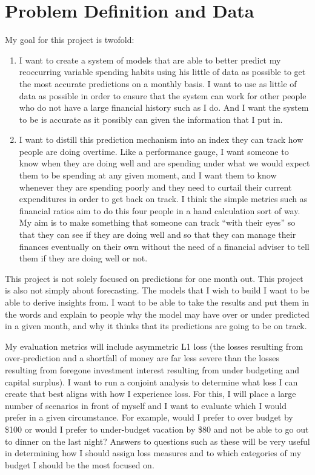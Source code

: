 \documentclass[11pt,a4paper]{article}
\begin{document}
\section{Problem Definition and Data}
\label{sec:problem}

My goal for this project is twofold: 
\begin{enumerate}
	\item I want to create a system of models that are able to better predict my reoccurring variable spending habits using his little of data as possible to get the most accurate predictions on a monthly basis.  I want to use as little of data as possible in order to ensure that the system can work for other people who do not have a large financial history such as I do. And I want the system to be is accurate as it possibly can given the information that I put in.
	\item I want to distill this prediction mechanism into an index they can track how people are doing overtime. Like a performance gauge, I want someone to know when they are doing well and are spending under what we would expect them to be spending at any given moment, and I want them to know whenever they are spending poorly and they need to curtail their current expenditures in order to get back on track. I think the simple metrics such as financial ratios aim to do this four people in a hand calculation sort of way. My aim is to make something that someone can track “with their eyes” so that they can see if they are doing well and so that they can manage their finances eventually on their own without the need of a financial adviser to tell them if they are doing well or not. 
\end{enumerate}

This project is not solely focused on predictions for one month out. This project is also not simply about forecasting. The models that I wish to build I want to be able to derive insights from. I want to be able to take the results and put them in the words and explain to people why the model may have over or under predicted in a given month, and why it thinks that its predictions are going to be on track. 

My evaluation metrics will include asymmetric L1 loss (the losses resulting from over-prediction and a shortfall of money are far less severe than the losses resulting from foregone investment interest resulting from under budgeting and capital surplus). I want to run a conjoint analysis to determine what loss I can create that best aligns with how I experience loss. For this, I will place a large number of scenarios in front of myself and I want to evaluate which I would prefer in a given circumstance. For example, would I prefer to over budget by \$100 or would I prefer to under-budget vacation by \$80 and not be able to go out to dinner on the last night? Answers to questions such as these will be very useful in determining how I should assign loss measures and to which categories of my budget I should be the most focused on. 
\end{document}
